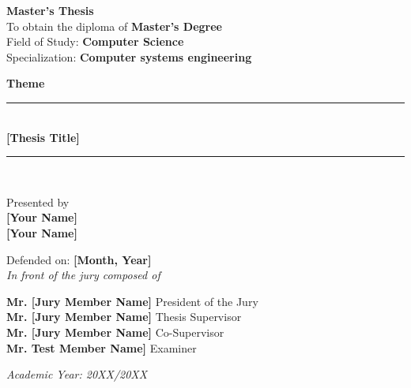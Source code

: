 \begin{titlepage}
\vspace{0.3cm}

\Large \textbf{Master's Thesis} \\
\vspace{0.4cm}
{\normalsize To obtain the diploma of \textbf{Master's Degree}} \\
{\normalsize Field of Study: \textbf{Computer Science}} \\
{\normalsize Specialization: \textbf{Computer systems engineering}} \\
\vspace{0.4cm}

\Large \textbf{Theme}\\
\rule{15cm}{0.2mm}\\
\vspace{0.4cm}
\centering
{\textbf{[Thesis Title]}}\\
\rule{15cm}{0.2mm}\\
\vspace{0.2cm}

\normalsize Presented by\\
{\normalsize \textbf{[Your Name]}}\\
{\normalsize \textbf{[Your Name]}}\\

\vspace{0.2cm}

{\normalsize Defended on: \textbf{[Month, Year]}}\\
{\normalsize \textit{In front of the jury composed of}}\\

\vspace{0.2cm}

\begin{center}
    {\normalsize \textbf{Mr. [Jury Member Name]} \hfill President of the Jury}\\
    {\normalsize \textbf{Mr. [Jury Member Name]} \hfill Thesis Supervisor}\\
    {\normalsize \textbf{Mr. [Jury Member Name]} \hfill Co-Supervisor}\\
    {\normalsize \textbf{Mr. Test Member Name]} \hfill Examiner}\\
\end{center}

\vspace{0.5cm}

\normalsize \textit{Academic Year: 20XX/20XX}
\end{titlepage}
